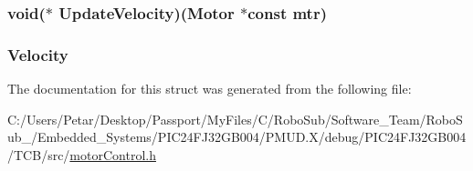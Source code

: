 \subsubsection[{Update\+Velocity}]{\setlength{\rightskip}{0pt plus 5cm}void($\ast$ Update\+Velocity)({\bf Motor} $\ast$const mtr)}\label{struct_motor_struct_ac44bd3fd97a074a0f7494c1b4d41f48b}
\hypertarget{struct_motor_struct_adc16841deb19f1da341eec0e8f1d0cce}{}
\subsubsection[{Velocity}]{ Velocity}\label{struct_motor_struct_adc16841deb19f1da341eec0e8f1d0cce}


The documentation for this struct was generated from the following file\+:\begin{DoxyCompactItemize}
\item 
C\+:/\+Users/\+Petar/\+Desktop/\+Passport/\+My\+Files/\+C/\+Robo\+Sub/\+Software\+\_\+\+Team/\+Robo\+Sub\+\_/\+Embedded\+\_\+\+Systems/\+P\+I\+C24\+F\+J32\+G\+B004/\+P\+M\+U\+D.\+X/debug/\+P\+I\+C24\+F\+J32\+G\+B004/\+T\+C\+B/src/\hyperlink{_p_m_u_d_8_x_2debug_2_p_i_c24_f_j32_g_b004_2_t_c_b_2src_2motor_control_8h}{motor\+Control.\+h}\end{DoxyCompactItemize}
